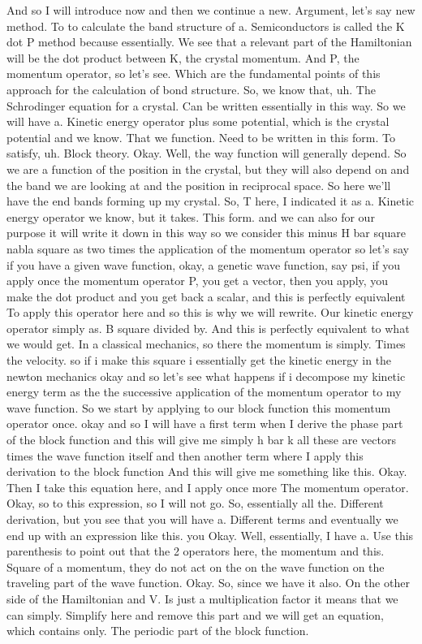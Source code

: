 And so I will introduce now and then we continue a new. Argument, let's say new method. To to calculate the band structure of a. Semiconductors is called the K dot P method because essentially. We see that a relevant part of the Hamiltonian will be the dot product between K, the crystal momentum. And P, the momentum operator, so let's see. Which are the fundamental points of this approach for the calculation of bond structure. So, we know that, uh. The Schrodinger equation for a crystal. Can be written essentially in this way. So we will have a. Kinetic energy operator plus some potential, which is the crystal potential and we know. That we function. Need to be written in this form. To satisfy, uh. Block theory. Okay. Well, the way function will generally depend. So we are a function of the position in the crystal, but they will also depend on and the band we are looking at and the position in reciprocal space. So here we'll have the end bands forming up my crystal. So, T here, I indicated it as a. Kinetic energy operator we know, but it takes. This form. and we can also for our purpose it will write it down in this way so we consider this minus H bar square nabla square as two times the application of the momentum operator so let's say if you have a given wave function, okay, a genetic wave function, say psi, if you apply once the momentum operator P, you get a vector, then you apply, you make the dot product and you get back a scalar, and this is perfectly equivalent To apply this operator here and so this is why we will rewrite. Our kinetic energy operator simply as. B square divided by. And this is perfectly equivalent to what we would get. In a classical mechanics, so there the momentum is simply. Times the velocity. so if i make this square i essentially get the kinetic energy in the newton mechanics okay and so let's see what happens if i decompose my kinetic energy term as the the successive application of the momentum operator to my wave function. So we start by applying to our block function this momentum operator once. okay and so I will have a first term when I derive the phase part of the block function and this will give me simply h bar k all these are vectors times the wave function itself and then another term where I apply this derivation to the block function And this will give me something like this. Okay. Then I take this equation here, and I apply once more The momentum operator. Okay, so to this expression, so I will not go. So, essentially all the. Different derivation, but you see that you will have a. Different terms and eventually we end up with an expression like this. you Okay. Well, essentially, I have a. Use this parenthesis to point out that the 2 operators here, the momentum and this. Square of a momentum, they do not act on the on the wave function on the traveling part of the wave function. Okay. So, since we have it also. On the other side of the Hamiltonian and V. Is just a multiplication factor it means that we can simply. Simplify here and remove this part and we will get an equation, which contains only. The periodic part of the block function.

